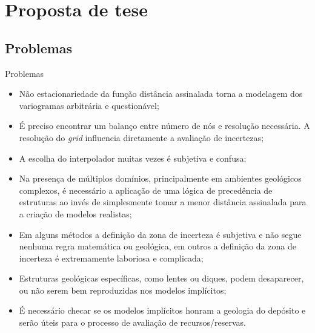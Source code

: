 \documentclass[aspectratio=169]{beamer}
\begin{document}
\section{Proposta de tese}

\subsection{Problemas}

\begin{frame}[allowframebreaks]{Problemas}

	\begin{itemize}
		\item Não estacionariedade da função distância assinalada torna a modelagem dos variogramas arbitrária e questionável;
		\item É preciso encontrar um balanço entre número de nós e resolução necessária. A resolução do \textit{grid} influencia diretamente a avaliação de incertezas;
		\item A escolha do interpolador muitas vezes é subjetiva e confusa;
		\item Na presença de múltiplos domínios, principalmente em ambientes geológicos complexos, é necessário a aplicação de uma lógica de precedência de estruturas ao invés de simplesmente tomar a menor distância assinalada para a criação de modelos realistas;
		\item Em alguns métodos a definição da zona de incerteza é subjetiva e não segue nenhuma regra matemática ou geológica, em outros a definição da zona de incerteza é extremamente laboriosa e complicada;
		\item Estruturas geológicas específicas, como lentes ou diques, podem desaparecer, ou não serem bem reproduzidas nos modelos implícitos;
		\item É necessário checar se os modelos implícitos honram a geologia do depósito e serão úteis para o processo de avaliação de recursos/reservas.
	\end{itemize}
\end{frame}
\end{document}
